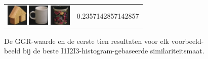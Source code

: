 \begin{figure}[tbp]
\begin{center}
\begin{tabular}{m{11cm} | m{3cm} |}
\includegraphics[width=1cm]{coil/beeld-45.eps}
\includegraphics[width=1cm]{coil/beeld-37.eps}
\includegraphics[width=1cm]{coil/beeld-62.eps}
& {\scriptsize 0.2357142857142857}
\end{tabular}
\caption{\label{fig:results_i1i2i3_histgeb}De GGR-waarde en de eerste tien resultaten voor elk voorbeeld-beeld bij de beste I1I2I3-histogram-gebaseerde similariteitsmaat.}
\end{center}
\end{figure}

